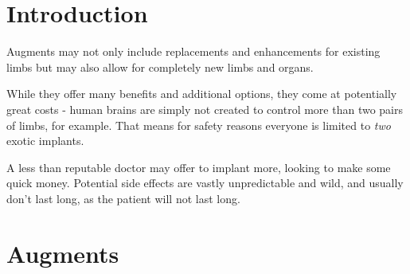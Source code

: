 \documentclass[12pt,a4paper,openany,usenames,dvipsnames]{book}
\begin{document}
	

    \chapter{Introduction}
    Augments may not only include replacements and enhancements for existing limbs but may also allow for completely new limbs and organs.
    \par
    While they offer many benefits and additional options, they come at potentially great costs
    	- human brains are simply not created to control more than two pairs of limbs, for example.
   	That means for safety reasons everyone is limited to \emph{two} exotic implants.
    \par
    A less than reputable doctor may offer to implant more, looking to make some quick money. Potential side effects are vastly unpredictable and wild, and usually don't last long, as the patient will not last long.

    \chapter{Augments}
\end{document}

